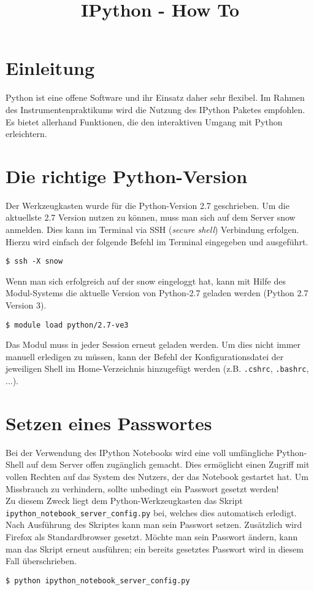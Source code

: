 \documentclass[a4paper]{article}
\title{IPython - How To}
\author{}
\date{}
\begin{document}
\maketitle
\section*{Einleitung} Python ist eine offene Software und ihr Einsatz daher sehr flexibel. Im Rahmen des Instrumentenpraktikums wird die Nutzung des IPython Paketes empfohlen. Es bietet allerhand Funktionen, die den interaktiven Umgang mit Python erleichtern.

\section*{Die richtige Python-Version} Der Werkzeugkasten wurde für die Python-Version 2.7 geschrieben. Um die aktuellste 2.7 Version nutzen zu können, muss man sich auf dem Server snow anmelden. Dies kann im Terminal via SSH (\textit{secure shell}) Verbindung erfolgen. Hierzu wird einfach der folgende Befehl im Terminal eingegeben und ausgeführt.
\begin{shaded}
\verb+$ ssh -X snow+
\end{shaded}

Wenn man sich erfolgreich auf der snow eingeloggt hat, kann mit Hilfe des Modul-Systems die aktuelle Version von Python-2.7 geladen werden (Python 2.7 Version 3).
\begin{shaded}
\verb+$ module load python/2.7-ve3+
\end{shaded}

Das Modul muss in jeder Session erneut geladen werden. Um dies nicht immer manuell erledigen zu müssen, kann der Befehl der Konfigurationsdatei der jeweiligen Shell im Home-Verzeichnis hinzugefügt werden (z.B. \verb+.cshrc+, \verb+.bashrc+, ...).

\section*{Setzen eines Passwortes} Bei der Verwendung des IPython Notebooks wird eine voll umfängliche Python-Shell auf dem Server offen zugänglich gemacht. Dies ermöglicht einen Zugriff mit vollen Rechten auf das System des Nutzers, der das Notebook gestartet hat. Um Missbrauch zu verhindern, sollte unbedingt ein Passwort gesetzt werden!\\
Zu diesem Zweck liegt dem Python-Werkzeugkasten das Skript \verb+ipython_notebook_server_config.py+ bei, welches dies automatisch erledigt. Nach Ausführung des Skriptes kann man sein Passwort setzen. Zusätzlich wird Firefox als Standardbrowser gesetzt. Möchte man sein Passwort ändern, kann man das Skript erneut ausführen; ein bereits gesetztes Passwort wird in diesem Fall überschrieben.
\begin{shaded}
\verb+$ python ipython_notebook_server_config.py+
\end{shaded}
\end{document}
